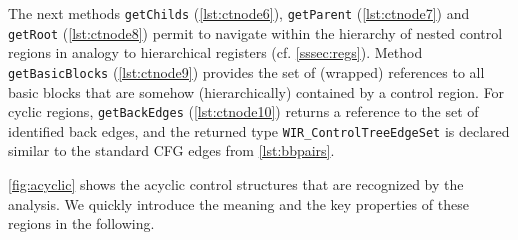 The next methods \texttt{getChilds} (\cref{lst:ctnode6}), \texttt{getParent} (\cref{lst:ctnode7}) and \texttt{getRoot} (\cref{lst:ctnode8}) permit to navigate within the hierarchy of nested control regions in analogy to hierarchical registers (cf. \cref{sssec:regs}).
Method \texttt{getBasic\-Blocks} (\cref{lst:ctnode9}) provides the set of (wrapped) references to all basic blocks that are somehow (hierarchically) contained by a control region.
For cyclic regions, \texttt{getBackEdges} (\cref{lst:ctnode10}) returns a reference to the set of identified back edges, and the returned type \texttt{WIR\_ControlTreeEdgeSet} is declared similar to the standard \gls{CFG} edges from \cref{lst:bbpairs}.

\cref{fig:acyclic} shows the acyclic control structures that are recognized by the analysis.
We quickly introduce the meaning and the key properties of these regions in the following.

